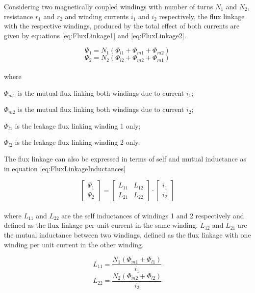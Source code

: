 Considering two magnetically coupled windings with number of turns $N_1$ and $N_2$, resistance $r_1$ and $r_2$ and winding currents $i_1$ and $i_2$ respectively, the flux linkage with the respective windings, produced by the total effect of both currents are given by equations \ref{eq:FluxLinkage1} and \ref{eq:FluxLinkage2}.

\begin{equation} \label{eq:FluxLinkage1}
	\Psi_1 = N_1(\Phi_{l1} + \Phi_{m1} + \Phi_{m2})
\end{equation}
\begin{equation} \label{eq:FluxLinkage2}
	\Psi_2 = N_2(\Phi_{l2} + \Phi_{m2} + \Phi_{m1})
\end{equation}
\\
where

$\Phi_{m1}$ is the mutual flux linking both windings due to current $i_1$;

$\Phi_{m2}$ is the mutual flux linking both windings due to current $i_2$;

$\Phi_{l1}$ is the leakage flux linking winding 1 only;

$\Phi_{l2}$ is the leakage flux linking winding 2 only.

The flux linkage can also be expressed in terms of self and mutual inductance as in equation \ref{eq:FluxLinkageInductances}

\begin{equation} \label{eq:FluxLinkageInductances}
	\begin{bmatrix}
		\Psi_1\\
		\Psi_2
	\end{bmatrix}
		=
	\begin{bmatrix}
		L_{11} & L_{12}\\
		L_{21} & L_{22}
	\end{bmatrix}
		\cdot
	\begin{bmatrix}
		i_1\\
		i_2		
	\end{bmatrix}
\end{equation}
\\
where $L_{11}$ and $L_{22}$ are the self inductances of windings 1 and 2 respectively and defined as the flux linkage per unit current in the same winding. $L_{12}$ and $L_{21}$ are the mutual inductance between two windings, defined as the flux linkage with one winding per unit current in the other winding.

\begin{equation}
	L_{11} = \frac{N_1(\Phi_{m1} + \Phi_{l1})}{i_1}
\end{equation}
\begin{equation}
	L_{22} =  \frac{N_2(\Phi_{m2} + \Phi_{l2})}{i_2}
\end{equation}

